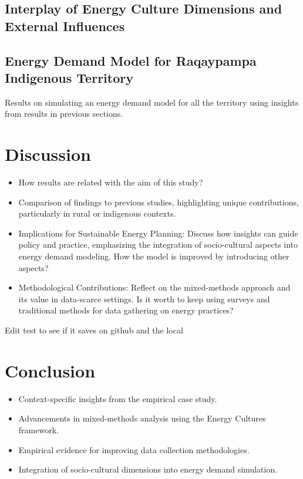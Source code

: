 \documentclass[final,3p,times,onecolumn]{elsarticle}
\begin{document}
\subsection{Interplay of Energy Culture Dimensions and External Influences}
\label{sec:external_influence}


\subsection{Energy Demand Model for Raqaypampa Indigenous Territory}
\label{sec:energy_demand_model}
Results on simulating an energy demand model for all the territory using insights from results in previous sections.

\section{Discussion}
\begin{itemize}
    \item How results are related with the aim of this study?
    \item Comparison of findings to previous studies, highlighting unique contributions, particularly in rural or indigenous contexts.
    \item Implications for Sustainable Energy Planning: Discuss how insights can guide policy and practice, emphasizing the integration of socio-cultural aspects into energy demand modeling. How the model is improved by introducing other aspects? 
    \item Methodological Contributions: Reflect on the mixed-methods approach and its value in data-scarce settings. Is it worth to keep using surveys and traditional methods for data gathering on energy practices? 
\end{itemize}

Edit test to see if it saves on github and the local

\section{Conclusion}
\label{sec:conslusion}
\begin{itemize}
    \item Context-specific insights from the empirical case study.
    \item Advancements in mixed-methods analysis using the Energy Cultures framework.
    \item Empirical evidence for improving data collection methodologies.
    \item Integration of socio-cultural dimensions into energy demand simulation.
\end{itemize}
\end{document}
